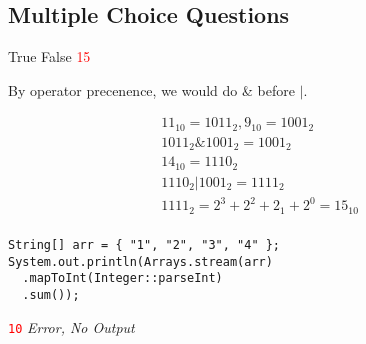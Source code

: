 \documentclass[11pt,addpoints]{exam}
\begin{document}
\begin{questions} %

\section{Multiple Choice Questions}


\begin{minipage}{\textwidth}

\begin{choices}
  \choice True
  \choice False
  \choice \textcolor{red}{15}
   \\
\end{choices}
\end{minipage}

By operator precenence, we would do \& before $|$.

\begin{align*}
  11_{10} = 1011_{2}, 9_{10} = 1001_{2} \\
  1011_{2} \& 1001_{2} = 1001_{2} \\
  14_{10} = 1110_{2} \\
  1110_{2} | 1001_{2} = 1111_{2} \\
  1111_{2} = 2^{3} + 2^{2} + 2_{1} + 2^{0} = 15_{10} \\
\end{align*}

\begin{minipage}{\textwidth}

\begin{verbatim}
String[] arr = { "1", "2", "3", "4" };
System.out.println(Arrays.stream(arr)
  .mapToInt(Integer::parseInt)
  .sum());
\end{verbatim}

\begin{choices}
  \choice \textcolor{red}{\tt 10}
  \choice \textit{Error, No Output} \\
\end{choices}
\end{minipage}


\end{questions}
\end{document}
